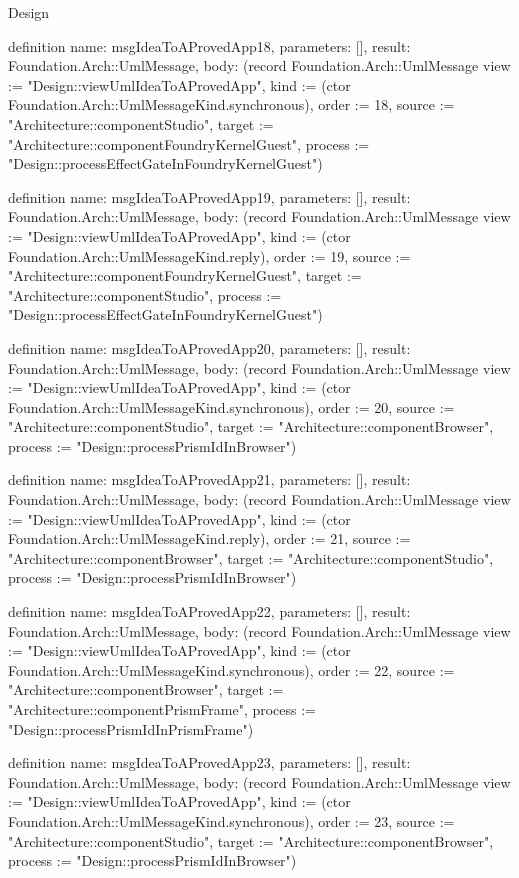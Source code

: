 \begin{lexlean}{Design}
\begin{semanticmodule}
definition{
  name: msgIdeaToAProvedApp18,
  parameters: [],
  result: Foundation.Arch::UmlMessage,
  body: (record Foundation.Arch::UmlMessage {view := "Design::viewUmlIdeaToAProvedApp", kind := (ctor Foundation.Arch::UmlMessageKind.synchronous), order := 18, source := "Architecture::componentStudio", target := "Architecture::componentFoundryKernelGuest", process := "Design::processEffectGateInFoundryKernelGuest"})
}

definition{
  name: msgIdeaToAProvedApp19,
  parameters: [],
  result: Foundation.Arch::UmlMessage,
  body: (record Foundation.Arch::UmlMessage {view := "Design::viewUmlIdeaToAProvedApp", kind := (ctor Foundation.Arch::UmlMessageKind.reply), order := 19, source := "Architecture::componentFoundryKernelGuest", target := "Architecture::componentStudio", process := "Design::processEffectGateInFoundryKernelGuest"})
}

definition{
  name: msgIdeaToAProvedApp20,
  parameters: [],
  result: Foundation.Arch::UmlMessage,
  body: (record Foundation.Arch::UmlMessage {view := "Design::viewUmlIdeaToAProvedApp", kind := (ctor Foundation.Arch::UmlMessageKind.synchronous), order := 20, source := "Architecture::componentStudio", target := "Architecture::componentBrowser", process := "Design::processPrismIdInBrowser"})
}

definition{
  name: msgIdeaToAProvedApp21,
  parameters: [],
  result: Foundation.Arch::UmlMessage,
  body: (record Foundation.Arch::UmlMessage {view := "Design::viewUmlIdeaToAProvedApp", kind := (ctor Foundation.Arch::UmlMessageKind.reply), order := 21, source := "Architecture::componentBrowser", target := "Architecture::componentStudio", process := "Design::processPrismIdInBrowser"})
}

definition{
  name: msgIdeaToAProvedApp22,
  parameters: [],
  result: Foundation.Arch::UmlMessage,
  body: (record Foundation.Arch::UmlMessage {view := "Design::viewUmlIdeaToAProvedApp", kind := (ctor Foundation.Arch::UmlMessageKind.synchronous), order := 22, source := "Architecture::componentBrowser", target := "Architecture::componentPrismFrame", process := "Design::processPrismIdInPrismFrame"})
}

definition{
  name: msgIdeaToAProvedApp23,
  parameters: [],
  result: Foundation.Arch::UmlMessage,
  body: (record Foundation.Arch::UmlMessage {view := "Design::viewUmlIdeaToAProvedApp", kind := (ctor Foundation.Arch::UmlMessageKind.synchronous), order := 23, source := "Architecture::componentStudio", target := "Architecture::componentBrowser", process := "Design::processPrismIdInBrowser"})
}


\end{semanticmodule}
\end{lexlean}
